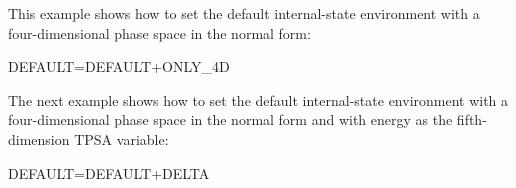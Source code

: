 This example shows how to set the default internal-state environment with a
four-dimensional phase space in the normal form:

\begin{ptccode}
DEFAULT=DEFAULT+ONLY\_4D\\
\end{ptccode}

The next example shows how to set the default internal-state environment with a
four-dimensional phase space in the normal form and with energy as the fifth-dimension
TPSA variable:

\begin{ptccode}
DEFAULT=DEFAULT+DELTA\\
\end{ptccode}

\endinput
